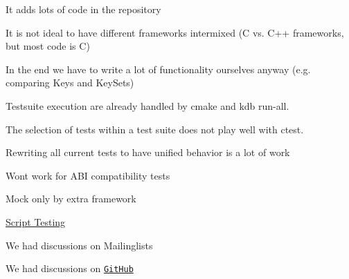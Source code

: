 \begin{DoxyItemize}
\item It adds lots of code in the repository
\item It is not ideal to have different frameworks intermixed (C vs. C++ frameworks, but most code is C)
\item In the end we have to write a lot of functionality ourselves anyway (e.\+g. comparing Keys and Key\+Sets)
\item Testsuite execution are already handled by cmake and kdb run-\/all.
\item The selection of tests within a test suite does not play well with ctest.
\item Rewriting all current tests to have unified behavior is a lot of work
\item Wont work for A\+BI compatibility tests
\item Mock only by extra framework
\end{DoxyItemize}


\begin{DoxyItemize}
\item \hyperlink{doc_decisions_script_testing_md}{Script Testing}
\end{DoxyItemize}


\begin{DoxyItemize}
\item We had discussions on Mailinglists
\item We had discussions on \href{https://github.com/ElektraInitiative/libelektra/pull/26}{\tt Git\+Hub} 
\end{DoxyItemize}